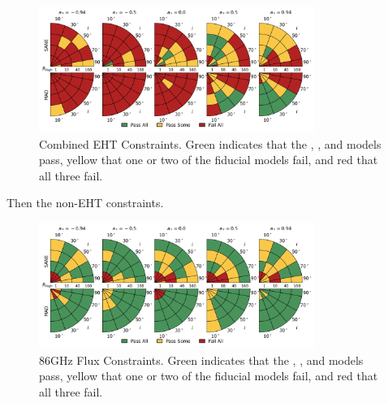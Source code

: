\begin{figure}
  \centering
  \includegraphics[width=0.8\textwidth]{./figures/Interferometric_Constraints.png}
  \caption{Combined EHT Constraints.  Green indicates that the \kharma, \bhac, and \hamr models pass, yellow that one or two of the fiducial models fail, and red that all three fail.}
  \label{fig:eht_comb_pizza}
\end{figure}

Then the non-EHT constraints.

\begin{figure}
  \centering
  \includegraphics[width=0.8\textwidth]{./figures/86GHz_flux_Constraints.png}
  \caption{86GHz Flux Constraints.  Green indicates that the \kharma, \bhac, and \hamr models pass, yellow that one or two of the fiducial models fail, and red that all three fail.}
  \label{fig:86GHz_flux_pizza}
\end{figure}

